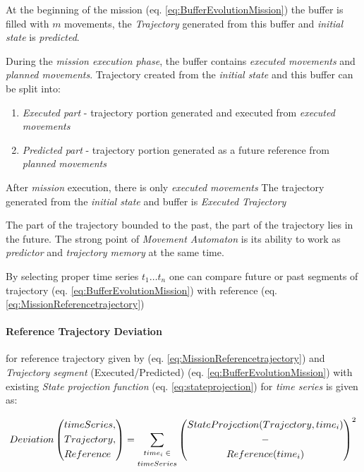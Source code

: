At the beginning of the mission (eq. \ref{eq:BufferEvolutionMission}) the buffer is filled with $m$ movements, the \emph{Trajectory} generated from this buffer and \emph{initial state} is \emph{predicted}.

During the \emph{mission execution phase}, the buffer contains \emph{executed movements} and \emph{planned movements}. Trajectory created from the \emph{initial state} and this buffer can be split into:

\begin{enumerate}
    \item\emph{Executed part} - trajectory portion generated and executed from \emph{executed movements}
    
    \item\emph{Predicted part} - trajectory portion generated as a future reference from \emph{planned movements} 
\end{enumerate}

After \emph{mission} execution, there is only \emph{executed movements} The trajectory generated from the \emph{initial state} and buffer is \emph{Executed Trajectory}

\begin{note}
    The part of the trajectory bounded to the past, the part of the trajectory lies in the future. The strong point of \emph{Movement Automaton} is its ability to work as \emph{predictor} and \emph{trajectory memory} at the same time.
    
    By selecting proper time series $t_1\dots t_n$ one can compare future or past segments of trajectory (eq. \ref{eq:BufferEvolutionMission}) with reference (eq. \ref{eq:MissionReferencetrajectory})
\end{note}

\paragraph{Reference Trajectory Deviation} for reference trajectory given by (eq. \ref{eq:MissionReferencetrajectory}) and \emph{Trajectory segment} (Executed/Predicted) (eq. \ref{eq:BufferEvolutionMission}) with existing \emph{State projection function} (eq. \ref{eq:stateprojection}) for \emph{time series} is given as:

\begin{equation}\label{eq:ReferenceTrajectoryDeviation}
    Deviation\left(\begin{aligned}&timeSeries,\\ &Trajectory,\\ &Reference\end{aligned}\right) = \sum_{\scriptsize\begin{gathered}time_i \in\\ timeSeries\end{gathered}\normalsize} \left(\begin{gathered}StateProjection(Trajectory,time_i)\\-\\Reference(time_i)\end{gathered}\right)^2
\end{equation}

